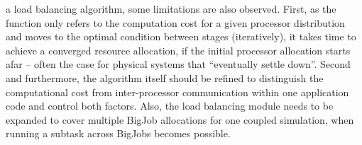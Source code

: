 \documentclass[conference,final]{IEEEtran}
\newcommand{\jhanote}[1]{ {\textcolor{red} { ***Jha: #1 }}}
\newcommand{\jhanote}[1]{}
\begin{document}


a load balancing algorithm, some limitations are also observed. First,
as the function only refers to the computation cost for a given processor distribution and moves to the optimal condition between stages (iteratively), it takes time to achieve a converged resource allocation, if the initial processor allocation starts afar -- often the case for physical systems that ``eventually settle down''. Second and furthermore, the algorithm itself should be refined to distinguish the computational cost from inter-processor communication within one application code and control both factors. Also, the load balancing module needs to be expanded to cover multiple BigJob allocations for one coupled simulation, when running a subtask across BigJobs becomes possible.
\end{document}
